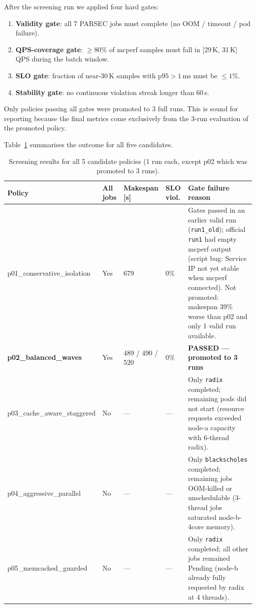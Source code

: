 After the screening run we applied four hard gates:
\begin{enumerate}
  \item \textbf{Validity gate}: all 7 PARSEC jobs must complete
    (no OOM / timeout / pod failure).
  \item \textbf{QPS-coverage gate}: $\geq 80\%$ of mcperf samples must fall
    in [29\,K, 31\,K]\,QPS during the batch window.
  \item \textbf{SLO gate}: fraction of near-30\,K samples with
    $\mathrm{p95} > 1\,\mathrm{ms}$ must be $\leq 1\%$.
  \item \textbf{Stability gate}: no continuous violation streak longer than
    60\,s.
\end{enumerate}
Only policies passing all gates were promoted to 3 full runs.
This is sound for reporting because the final metrics come exclusively from the
3-run evaluation of the promoted policy.

Table~\ref{tab:screening} summarises the outcome for all five candidates.

\begin{table}[h]
\centering
\caption{Screening results for all 5 candidate policies (1 run each, except
  p02 which was promoted to 3 runs).}
\label{tab:screening}
\begin{tabular}{llllp{5cm}}
\toprule
\textbf{Policy} & \textbf{All jobs} & \textbf{Makespan [s]} &
\textbf{SLO viol.} & \textbf{Gate failure reason} \\
\midrule
p01\_conservative\_isolation & Yes & 679 & 0\% &
  Gates passed in an earlier valid run (\texttt{run1\_old}); official
  \texttt{run1} had empty mcperf output (script bug: Service IP not yet
  stable when mcperf connected).  Not promoted: makespan 39\% worse than
  p02 and only 1 valid run available. \\
\textbf{p02\_balanced\_waves} & Yes & 489 / 490 / 520 & 0\% &
  \textbf{PASSED — promoted to 3 runs} \\
p03\_cache\_aware\_staggered & No & --- & --- &
  Only \texttt{radix} completed; remaining pods did not start
  (resource requests exceeded node-a capacity with 6-thread radix). \\
p04\_aggressive\_parallel    & No & --- & --- &
  Only \texttt{blackscholes} completed; remaining jobs OOM-killed or
  unschedulable (3-thread jobs saturated node-b-4core memory). \\
p05\_memcached\_guarded      & No & --- & --- &
  Only \texttt{radix} completed; all other jobs remained Pending
  (node-b already fully requested by radix at 4 threads). \\
\bottomrule
\end{tabular}
\end{table}

